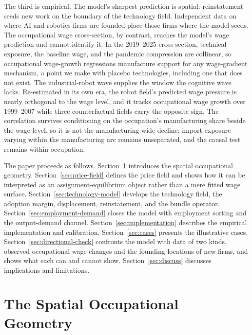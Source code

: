 \documentclass[12pt, a4paper]{article}
\begin{document}
The third is empirical.
The model's sharpest prediction is spatial: reinstatement seeds new work
on the boundary of the technology field. Independent data on where AI
and robotics firms are founded place those firms where the model seeds.
The occupational wage cross-section, by contrast, reaches the model's
wage prediction and cannot identify it.
In the 2019--2025 cross-section, technical exposure, the baseline wage,
and the pandemic compression are collinear, so occupational wage-growth
regressions manufacture support for any wage-gradient mechanism, a point
we make with placebo technologies, including one that does not exist.
The industrial-robot wave supplies the window the cognitive wave lacks.
Re-estimated in its own era, the robot field's predicted wage pressure
is nearly orthogonal to the wage level, and it tracks occupational wage
growth over 1999--2007 while three counterfactual fields carry the
opposite sign. The correlation survives conditioning on the
occupation's manufacturing share beside the wage level, so it is not
the manufacturing-wide decline; import exposure varying within the
manufacturing arc remains unseparated, and the causal test remains
within-occupation.

The paper proceeds as follows.
Section~\ref{sec:geometry} introduces the spatial occupational geometry.
Section~\ref{sec:price-field} defines the price field and shows how it
can be interpreted as an assignment-equilibrium object rather than a
mere fitted wage surface. Section~\ref{sec:technology-model} develops
the technology field, the adoption margin, displacement, reinstatement,
and the bundle operator. Section~\ref{sec:employment-demand} closes the
model with employment sorting and the output-demand channel.
Section~\ref{sec:implementation} describes the empirical implementation
and calibration. Section~\ref{sec:cases} presents the illustrative
cases. Section~\ref{sec:directional-check} confronts the model with data of
two kinds, observed occupational wage changes and the founding locations
of new firms, and shows what each can and cannot show.
Section~\ref{sec:discuss} discusses implications and limitations.

\section{The Spatial Occupational Geometry}
\label{sec:geometry}
\end{document}
